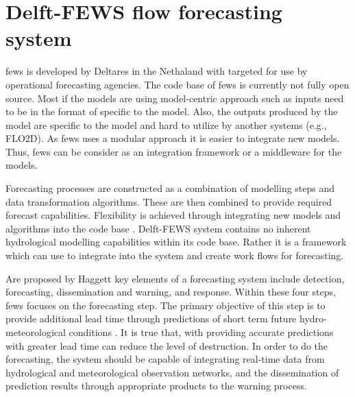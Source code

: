 \section{Delft-FEWS flow forecasting system}
\acrshort{fews} is developed by Deltares in the Nethaland with targeted for use by operational forecasting agencies. %
The code base of \acrshort{fews} is currently not fully open source. %
Most if the models are using model-centric approach such as inputs need to be in the format of specific to the model. Also, the outputs produced by the model are specific to the model and hard to utilize by another systems (e.g., FLO2D). As \acrshort{fews} %
uses a modular approach it is easier to integrate new models.%
Thus, \acrshort{fews} can be consider as an integration framework or a middleware for the models.

Forecasting processes are constructed as a combination of modelling steps and data transformation algorithms. These are then combined to provide required forecast capabilities. Flexibility is achieved through integrating new models and algorithms into the code base \cite{Werner2013TheSystem}. Delft-FEWS system contains no inherent hydrological modelling capabilities within its code base. Rather it is a framework which can use to integrate into the system and create work flows for forecasting.

Are proposed by Haggett \cite{Haggett1998AnWales} key elements of a forecasting system include detection, forecasting, dissemination and warning, and response. Within these four steps, \acrshort{fews} focuses on the forecasting step. The primary objective of this step is to provide additional lead time through predictions of short term future hydro-meteorological conditions \cite{Werner2005FloodCatchments}. It is true that, with providing accurate predictions with greater lead time can reduce the level of destruction. In order to do the forecasting, the system should be capable of integrating real-time data from hydrological and meteorological observation networks, and the dissemination of prediction results through appropriate products to the warning process.

